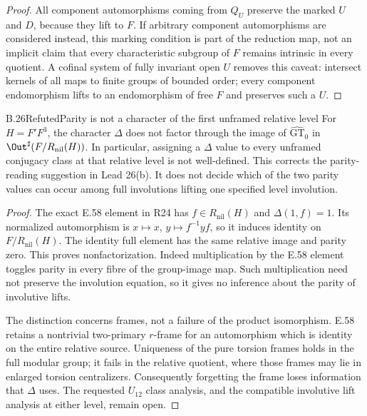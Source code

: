 \begin{proof}
All component automorphisms coming from $Q_U$ preserve the
marked $U$ and $D$, because they lift to $F$. If arbitrary
component automorphisms are considered instead, this marking
condition is part of the reduction map, not an implicit claim
that every characteristic subgroup of $F$ remains intrinsic
in every quotient. A cofinal system of fully invariant open
$U$ removes this caveat: intersect kernels of all maps to
finite groups of bounded order; every component endomorphism
lifts to an endomorphism of free $F$ and preserves such a $U$.
\end{proof}

\begin{statement}{B.26}{Refuted}{Parity is not a character of the first unframed relative level}
For $H=F'F^3$, the character $\Delta$ does not factor through
the image of $\widehat{\mathrm{GT}}_0$ in
$\Out^\sharp(F/R_{\mathrm{nil}}(H))$.
In particular, assigning a $\Delta$ value to every unframed
conjugacy class at that relative level is not well-defined.
This corrects the parity-reading suggestion in Lead 26(b).
It does not decide which of the two parity values can occur
among full involutions lifting one specified level involution.
\end{statement}
\begin{proof}
The exact E.58 element in R24 has $f\in R_{\mathrm{nil}}(H)$
and $\Delta(1,f)=1$. Its normalized automorphism is
$x\mapsto x$, $y\mapsto f^{-1}yf$, so it induces identity
on $F/R_{\mathrm{nil}}(H)$. The identity full element has the
same relative image and parity zero. This proves nonfactorization.
Indeed multiplication by the E.58 element toggles parity in
every fibre of the group-image map. Such multiplication need
not preserve the involution equation, so it gives no inference
about the parity of involutive lifts.

The distinction concerns frames, not a failure of the product
isomorphism. E.58 retains a nontrivial two-primary $r$-frame
for an automorphism which is identity on the entire relative
source. Uniqueness of the pure torsion frames holds in the full
modular group; it fails in the relative quotient, where those
frames may lie in enlarged torsion centralizers. Consequently
forgetting the frame loses information that $\Delta$ uses.
The requested $U_{12}$ class analysis, and the compatible
involutive lift analysis at either level, remain open.
\end{proof}

